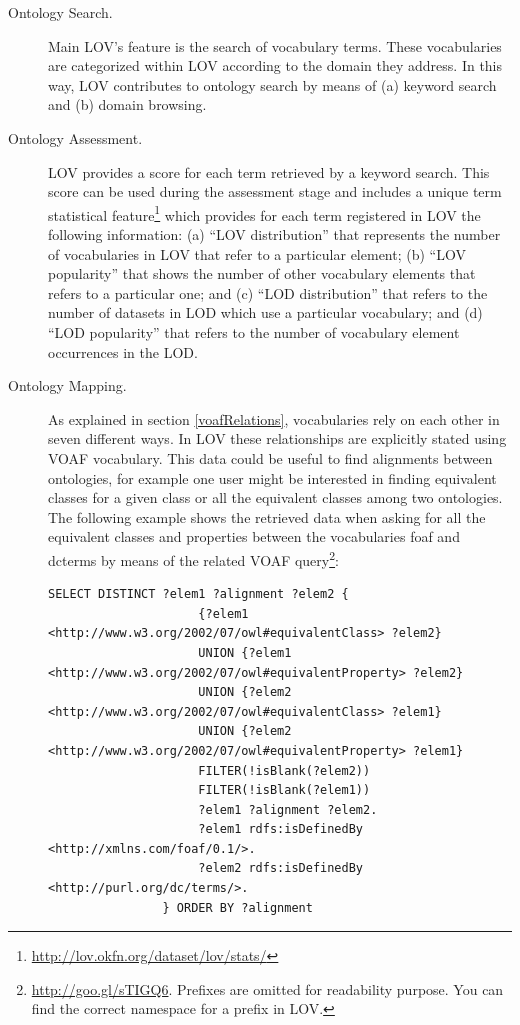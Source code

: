 \begin{description}
		\item [Ontology Search.] Main LOV's feature is the search of vocabulary terms. These vocabularies are categorized within LOV according to the domain they address. In this way, LOV contributes to ontology search by means of (a) keyword search and (b) domain browsing.
		\item [Ontology Assessment.] LOV provides a score for each term retrieved by a keyword search. This score can be used during the assessment stage and includes a unique term statistical feature\footnote{\url{http://lov.okfn.org/dataset/lov/stats/}} which provides for each term registered in LOV the following information: (a) ``LOV distribution'' that represents the number of vocabularies in LOV that refer to a particular element; (b) ``LOV popularity'' that shows the number of other vocabulary elements that refers to a particular one; and (c) ``LOD distribution'' that refers to the number of datasets in LOD which use a particular vocabulary; and (d) ``LOD popularity'' that refers to the number of vocabulary element occurrences in the LOD.
		\item [Ontology Mapping.] As explained in section \ref{voafRelations}, vocabularies rely on each other in seven different ways. In LOV these relationships are explicitly stated using VOAF vocabulary. This data could be useful to find alignments between ontologies, for example one user might be interested in finding equivalent classes for a given class or all the equivalent classes among two ontologies. The following example shows the retrieved data when asking for all the equivalent classes and properties between the vocabularies foaf and dcterms by means of the related VOAF query\footnote{\url{http://goo.gl/sTIGQ6}. Prefixes are omitted for readability purpose. You can find the correct namespace for a prefix in LOV.}: 
				
		{\small\begin{verbatim}SELECT DISTINCT ?elem1 ?alignment ?elem2 {
				     {?elem1 <http://www.w3.org/2002/07/owl#equivalentClass> ?elem2}
				     UNION {?elem1 <http://www.w3.org/2002/07/owl#equivalentProperty> ?elem2}
				     UNION {?elem2 <http://www.w3.org/2002/07/owl#equivalentClass> ?elem1}
				     UNION {?elem2 <http://www.w3.org/2002/07/owl#equivalentProperty> ?elem1}
				     FILTER(!isBlank(?elem2))
				     FILTER(!isBlank(?elem1))
				     ?elem1 ?alignment ?elem2.
				     ?elem1 rdfs:isDefinedBy <http://xmlns.com/foaf/0.1/>.
				     ?elem2 rdfs:isDefinedBy <http://purl.org/dc/terms/>.
				} ORDER BY ?alignment\end{verbatim}}
				

\end{description}
